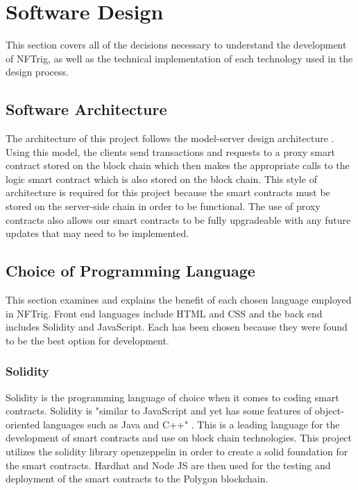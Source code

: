 \documentclass[acmsmall,nonacm]{acmart}
\begin{document}
\section{Software Design}
This section covers all of the decisions necessary to understand the development of NFTrig, as well as the technical implementation of each technology used in the design process.

\subsection{Software Architecture}
The architecture of this project follows the model-server design architecture \cite{oluwatosin2014client}. Using this model, the clients send transactions and requests to a proxy smart contract stored on the block chain which then makes the appropriate calls to the logic smart contract which is also stored on the block chain. This style of architecture is required for this project because the smart contracts must be stored on the server-side chain in order to be functional. The use of proxy contracts also allows our smart contracts to be fully upgradeable with any future updates that may need to be implemented.

\subsection{Choice of Programming Language}
This section examines and explains the benefit of each chosen language employed in NFTrig. Front end languages include HTML and CSS and the back end includes Solidity and JavaScript. Each has been chosen because they were found to be the best option for development.

\subsubsection{Solidity}
Solidity is the programming language of choice when it comes to coding smart contracts. Solidity is "similar to JavaScript and yet has some features of object-oriented languages such as Java and C++" \cite{mohanty2018basic}. This is a leading language for the development of smart contracts and use on block chain technologies. This project utilizes the solidity library openzeppelin in order to create a solid foundation for the smart contracts. Hardhat and Node JS are then used for the testing and deployment of the smart contracts to the Polygon blockchain.
\end{document}
